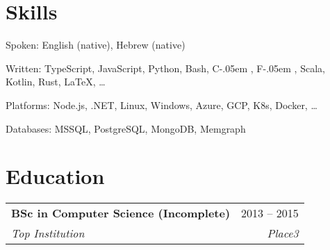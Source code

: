 \documentclass[a4paper,11pt]{article}
\makeatletter
\newcommand{\sharplang}[1]{%
    {\settoheight{\dimen0}{#1}#1\kern-.05em \resizebox{!}{\dimen0}{\raisebox{\depth}{\#}}}%
}
\newcommand{\placeblock}[4]{%
    \vspace{-2pt}\item%
    \begin{tabular*}{0.97\textwidth}[t]{l@{\extracolsep{\fill}}r}%
        \textbf{#1} & #2 \\%
        \textit{\small#3} & \textit{\small #4} \\%
    \end{tabular*}\vspace{-7pt}%
}%
\newcommand{\technion}{Technion}
\newcommand{\haifa}{Haifa, Israel}
\renewcommand{\technion}{Top Institution}
\renewcommand{\haifa}{Place3}
\makeatother
\begin{document}
\section{Skills}
\begin{skillList}
    \item[Spoken:] English (native), Hebrew (native)
    \item[Written:] TypeScript, JavaScript, Python, Bash, \sharplang{C}, \sharplang{F}, Scala, Kotlin, Rust, \LaTeX, \dots
    \item[Platforms:] Node.js, .NET, Linux, Windows, Azure, GCP, K8s, Docker, \dots
    \item[Databases:] MSSQL, PostgreSQL, MongoDB, Memgraph
\end{skillList}

\section{Education}
\begin{sectionList}%
    \placeblock{BSc in Computer Science (Incomplete)}{2013 -- 2015}{\technion}{\haifa}
\end{sectionList}

\end{document}

